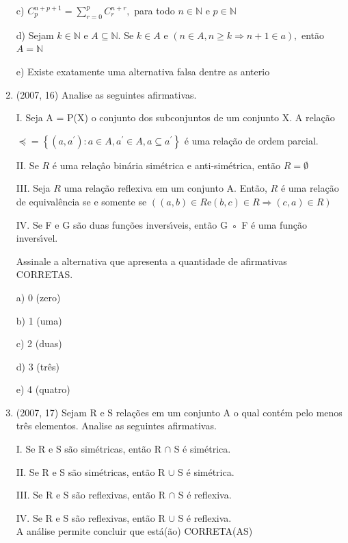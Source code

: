 \documentclass{article}
\begin{document}
\begin{enumerate}
c) $C_{p}^{n+p+1}=\sum_{r=0}^{p} C_{r}^{n+r},$ para todo $n \in \mathbb{N}$ e $p \in \mathbb{N}$

d) Sejam $k \in \mathbb{N}$ e $A \subseteq \mathbb{N} .$ Se $k \in A$ e $(n \in A, n \geq k \Rightarrow n+1 \in a),$ então 
\tildeo $A=\mathbb{N}$

e) Existe exatamente uma alternativa falsa dentre as anterio\newline




\item(2007, 16) Analise as seguintes afirmativas.

I. Seja A = P(X) o conjunto dos subconjuntos de um conjunto X. A relação

$\preceq=\left\{\left(a, a^{\prime}\right) : a \in A, a^{\prime} \in A, a \subseteq a^{\prime}\right\}$
é uma relação de ordem parcial.

II. Se $R$ é uma relaçâo binária simétrica e anti-simétrica, então \tildeo $R=\emptyset$

III. Seja $R$ uma relação reflexiva em um conjunto A. Então, $R$ é uma relação de equivalência se e somente se $((a, b) \in R \mathrm{e}(b, c) \in R \Rightarrow(c, a) \in R)$

IV. Se F e G são duas funções inversı́veis, então G ◦ F é uma função inversı́vel.

Assinale a alternativa que apresenta a quantidade de afirmativas CORRETAS.\newline

a) 0 (zero)

b) 1 (uma)

c) 2 (duas)

d) 3 (três)

e) 4 (quatro)\newline



\item(2007, 17) Sejam R e S relações em um conjunto A o qual contém pelo menos três elementos.
Analise as seguintes afirmativas.

I. Se R e S são simétricas, então R $\cap$ S é simétrica.

II. Se R e S são simétricas, então R $\cup$ S é simétrica.

III. Se R e S são reflexivas, então R $\cap$ S é reflexiva.

IV. Se R e S são reflexivas, então R $\cup$ S é reflexiva.\\

A análise permite concluir que está(ão) CORRETA(AS)\\


\end{enumerate}
\end{document}
